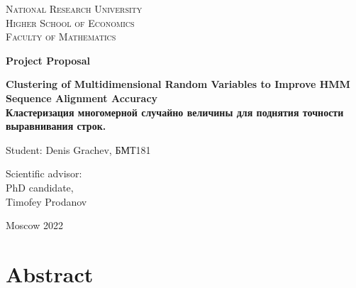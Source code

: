 \documentclass[a4paper, 12pt]{article}
\theoremstyle{definition}
\theoremstyle{definition}
\theoremstyle{remark}
\begin{document}
\renewcommand{\labelenumii}{\arabic{enumi}.\arabic{enumii}}
\renewcommand{\labelenumiii}{\arabic{enumi}.\arabic{enumii}.\arabic{enumiii}}
\renewcommand{\labelenumiv}{\arabic{enumi}.\arabic{enumii}.\arabic{enumiii}.\arabic{enumiv}}

\begin{center}
{\scshape National Research University\\
Higher School of Economics\\[1ex]
Faculty of Mathematics\par}

\par\vfill

\textbf{\large Project Proposal}

\vspace{1.5cm}

{\Large\bfseries
Clustering of Multidimensional Random Variables to Improve HMM Sequence Alignment Accuracy \\

Кластеризация многомерной случайно величины для поднятия точности выравнивания строк.
\par}

\vspace{1.5cm}

\par\vfill
\noindent\hspace{0.52\textwidth}\parbox[t]{0.48\textwidth}{%
Student: Denis Grachev, БМТ181\\[2ex]
}

\par\vfill
\noindent\hspace{0.52\textwidth}\parbox[t]{0.48\textwidth}{%
Scientific advisor:\\[3pt]
PhD candidate, \\ 
Timofey Prodanov\\[2ex]
}

\par\vfill\vfill
Moscow 2022
\end{center}
\thispagestyle{empty}
\pagebreak


\tableofcontents
\newpage

\section{Abstract}
\end{document}
